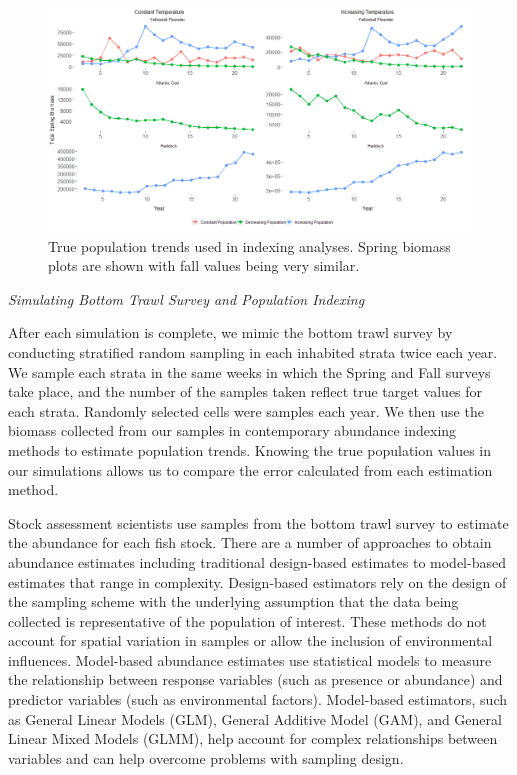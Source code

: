 \documentclass[
  12pt,
]{article}
\begin{document}
\begin{figure}

{\centering \includegraphics[width=0.99\linewidth]{Images/Population_scenarios} 

}

\caption{True population trends used in indexing analyses. Spring biomass plots are shown with fall values being very similar.}\label{fig:pop-scenarios}
\end{figure}

\emph{Simulating Bottom Trawl Survey and Population Indexing}

After each simulation is complete, we mimic the bottom trawl survey by conducting stratified random sampling in each inhabited strata twice each year. We sample each strata in the same weeks in which the Spring and Fall surveys take place, and the number of the samples taken reflect true target values for each strata. Randomly selected cells were samples each year. We then use the biomass collected from our samples in contemporary abundance indexing methods to estimate population trends. Knowing the true population values in our simulations allows us to compare the error calculated from each estimation method.

Stock assessment scientists use samples from the bottom trawl survey to estimate the abundance for each fish stock. There are a number of approaches to obtain abundance estimates including traditional design-based estimates to model-based estimates that range in complexity. Design-based estimators rely on the design of the sampling scheme with the underlying assumption that the data being collected is representative of the population of interest. These methods do not account for spatial variation in samples or allow the inclusion of environmental influences. Model-based abundance estimates use statistical models to measure the relationship between response variables (such as presence or abundance) and predictor variables (such as environmental factors). Model-based estimators, such as General Linear Models (GLM), General Additive Model (GAM), and General Linear Mixed Models (GLMM), help account for complex relationships between variables and can help overcome problems with sampling design.
\end{document}
